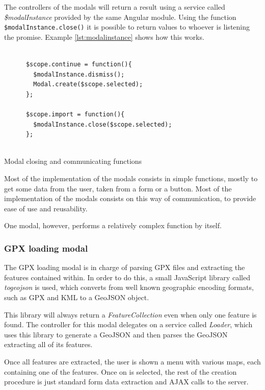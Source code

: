 The controllers of the modals will return a result using a service called \textit{\$modalInstance} provided by the same Angular module. Using the function \texttt{\$modalInstance.close()} it is possible to return values to whoever is listening the promise. Example \ref{lst:modalinstance} shows how this works.


\begin{listing}[ht]\centering
  \begin{minipage}{.7\textwidth}
    \begin{verbatim}
      
      $scope.continue = function(){
        $modalInstance.dismiss();
        Modal.create($scope.selected);
      };
      
      $scope.import = function(){
        $modalInstance.close($scope.selected);
      };
      
    \end{verbatim}
  \end{minipage}
  \caption{Modal closing and communicating functions}\label{lst:modalinstance}
\end{listing}

Most of the implementation of the modals consists in simple functions, mostly to get some data from the user, taken from a form or a button. Most of the implementation of the modals consists on this way of communication, to provide ease of use and reusability.

One modal, however, performs a relatively complex function by itself.

\subsubsection*{GPX loading modal}

The GPX loading modal is in charge of parsing GPX files and extracting the features contained within. In order to do this, a small JavaScript library called \textit{togeojson} is used, which converts from well known geographic encoding formats, such as GPX and KML to a GeoJSON object.

This library will always return a \textit{FeatureCollection} even when only one feature is found. The controller for this modal delegates on a service called \textit{Loader}, which uses this library to generate a GeoJSON and then parses the GeoJSON extracting all of its features.

Once all features are extracted, the user is shown a menu with various maps, each containing one of the features. Once on is selected, the rest of the creation procedure is just standard form data extraction and AJAX calls to the server.

